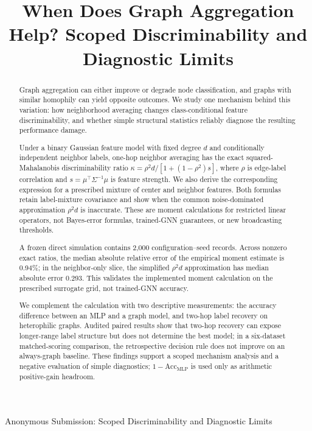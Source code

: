 \documentclass[lettersize,journal]{IEEEtran}
\begin{document}
\title{When Does Graph Aggregation Help? Scoped Discriminability and Diagnostic Limits}


%
{Anonymous Submission: Scoped Discriminability and Diagnostic Limits}


\maketitle

\begin{abstract}
Graph aggregation can either improve or degrade node classification, and graphs with similar homophily can yield opposite outcomes. We study one mechanism behind this variation: how neighborhood averaging changes class-conditional feature discriminability, and whether simple structural statistics reliably diagnose the resulting performance damage.

Under a binary Gaussian feature model with fixed degree $d$ and conditionally independent neighbor labels, one-hop neighbor averaging has the exact squared-Mahalanobis discriminability ratio $\kappa=\rho^2d/[1+(1-\rho^2)s]$, where $\rho$ is edge-label correlation and $s=\mu^\top\Sigma^{-1}\mu$ is feature strength. We also derive the corresponding expression for a prescribed mixture of center and neighbor features. Both formulas retain label-mixture covariance and show when the common noise-dominated approximation $\rho^2d$ is inaccurate. These are moment calculations for restricted linear operators, not Bayes-error formulas, trained-GNN guarantees, or new broadcasting thresholds.

A frozen direct simulation contains 2,000 configuration--seed records. Across nonzero exact ratios, the median absolute relative error of the empirical moment estimate is 0.94\%; in the neighbor-only slice, the simplified $\rho^2d$ approximation has median absolute error 0.293. This validates the implemented moment calculation on the prescribed surrogate grid, not trained-GNN accuracy.

We complement the calculation with two descriptive measurements: the accuracy difference between an MLP and a graph model, and two-hop label recovery on heterophilic graphs. Audited paired results show that two-hop recovery can expose longer-range label structure but does not determine the best model; in a six-dataset matched-scoring comparison, the retrospective decision rule does not improve on an always-graph baseline. These findings support a scoped mechanism analysis and a negative evaluation of simple diagnostics; $1-\mathrm{Acc}_{\mathrm{MLP}}$ is used only as arithmetic positive-gain headroom.
\end{abstract}
\end{document}

